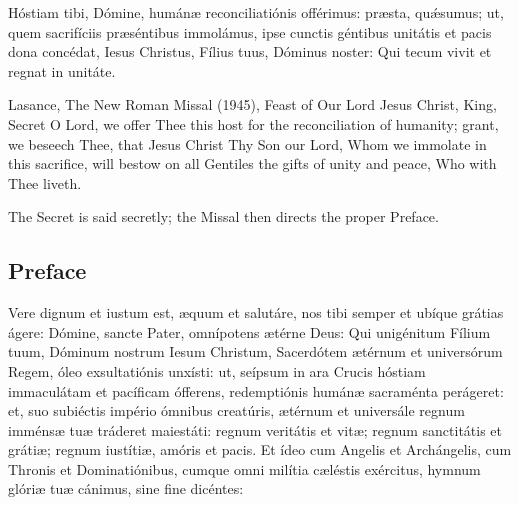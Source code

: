 \begin{latinproper}
Hóstiam tibi, Dómine, humánæ reconciliatiónis offérimus: præsta, quǽsumus;
ut, quem sacrifíciis præséntibus immolámus, ipse cunctis géntibus unitátis et
pacis dona concédat, Iesus Christus, Fílius tuus, Dóminus noster: Qui tecum
vivit et regnat in unitáte.
\end{latinproper}

\begin{englishwitness}{Lasance, The New Roman Missal (1945), Feast of Our Lord Jesus Christ, King, Secret}
O Lord, we offer Thee this host for the reconciliation of humanity; grant, we
beseech Thee, that Jesus Christ Thy Son our Lord, Whom we immolate in this
sacrifice, will bestow on all Gentiles the gifts of unity and peace, Who with
Thee liveth.
\end{englishwitness}

\noindent The Secret is said secretly; the Missal then directs the proper
Preface.

\subsection{Preface}
\label{proper-preface}


\begin{latinproper}
Vere dignum et iustum est, æquum et salutáre, nos tibi semper et ubíque
grátias ágere: Dómine, sancte Pater, omnípotens ætérne Deus: Qui unigénitum
Fílium tuum, Dóminum nostrum Iesum Christum, Sacerdótem ætérnum et
universórum Regem, óleo exsultatiónis unxísti: ut, seípsum in ara Crucis
hóstiam immaculátam et pacíficam ófferens, redemptiónis humánæ sacraménta
perágeret: et, suo subiéctis império ómnibus creatúris, ætérnum et universále
regnum imménsæ tuæ tráderet maiestáti: regnum veritátis et vitæ; regnum
sanctitátis et grátiæ; regnum iustítiæ, amóris et pacis. Et ídeo cum Angelis
et Archángelis, cum Thronis et Dominatiónibus, cumque omni milítia cæléstis
exércitus, hymnum glóriæ tuæ cánimus, sine fine dicéntes:
\end{latinproper}

